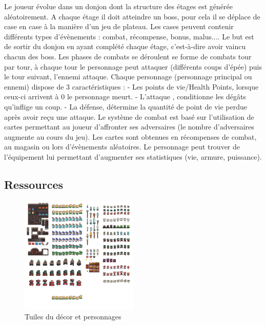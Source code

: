 \documentclass[a4paper,12pt]{article}
\begin{document}
Le joueur évolue dans un donjon dont la structure des étages est générée aléatoirement. A chaque étage il doit atteindre un boss, pour cela il se déplace de case en case à la manière d’un jeu de plateau. Les cases peuvent contenir différents types d'évènements : combat, récompense, bonus, malus.... Le but est de sortir du donjon en ayant complété chaque étage, c'est-à-dire avoir vaincu chacun des boss. 
Les phases de combats se déroulent se forme de combats tour par tour, à chaque tour le personnage peut attaquer (différents coups d'épée) puis le tour suivant, l'ennemi attaque. Chaque personnage (personnage principal ou ennemi) dispose de 3 caractéristiques :
- Les points de vie/Health Points, lorsque ceux-ci arrivent à 0 le personnage meurt. 
- L'attaque , conditionne les dégâts qu'inflige un coup.
- La défense, détermine la quantité de point de vie perdue après avoir reçu une attaque.
Le système de combat est basé sur l’utilisation de cartes permettant au joueur d’affronter ses adversaires (le nombre d’adversaires augmente au cours du jeu). Les cartes sont obtenues en récompenses de combat, au magasin ou lors d’évènements aléatoires. Le personnage peut trouver de l’équipement lui permettant d’augmenter ses statistiques (vie, armure, puissance).

\subsection{Ressources}

\begin{figure}[h]
\begin{center}
\includegraphics[width=0.5\textwidth]{dungeontiles.png}
\caption{\label{tiles}Tuiles du décor et personnages}
\end{center}
\end{figure}
\end{document}
